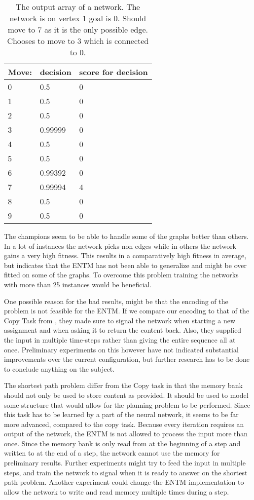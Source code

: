 \begin{table}[H]
	\centering
	\begin{tabular}{|l|l|l|}
		\hline
		Move:&	decision & score for decision\\\hline
		0&	0.5 & 0 \\\hline
		1&	0.5	& 0\\\hline
		2&	0.5	& 0\\\hline
		3&	0.99999 & 0\\\hline
		4&	0.5	& 0\\\hline
		5&	0.5	& 0\\\hline
		6&	0.99392 & 0\\\hline
		7&	0.99994 & 4\\\hline
		8&	0.5 & 0	\\\hline
		9&	0.5 & 0\\\hline
	\end{tabular}
	\caption{The output array of a network. The network is on vertex 1 goal is 0. Should move to 7 as it is the only possible edge. Chooses to move to 3 which is connected to 0.}
	\label{table:analysis:1}
\end{table}

\newpar The champions seem to be able to handle some of the graphs better than others. In a lot of instances the network picks non edges while in others the network gains a very high fitness. This results in a comparatively high fitness in average, but indicates that the ENTM has not been able to generalize and might be over fitted on some of the graphs. To overcome this problem training the networks with more than 25 instances would be beneficial.

\newpar One possible reason for the bad results, might be that the encoding of the problem is not feasible for the ENTM. If we compare our encoding to that of the Copy Task from \cite{greve2016evolving}, they made sure to signal the network when starting a new assignment and when asking it to return the content back. Also, they supplied the input in multiple time-steps rather than giving the entire sequence all at once. Preliminary experiments on this however have not indicated substantial improvements over the current configuration, but further research has to be done to conclude anything on the subject.

\newpar The shortest path problem differ from the Copy task in that the memory bank should not only be used to store content as provided. It should be used to model some structure that would allow for the planning problem to be performed. Since this task has to be learned by a part of the neural network, it seems to be far more advanced, compared to the copy task.
Because every iteration requires an output of the network, the ENTM is not allowed to process the input more than once. Since the memory bank is only read from at the beginning of a step and written to at the end of a step, the network cannot use the memory for preliminary results. 
Further experiments might try to feed the input in multiple steps, and train the network to signal when it is ready to answer on the shortest path problem. Another experiment could change the ENTM implementation to allow the network to write and read memory multiple times during a step.

\clearpage